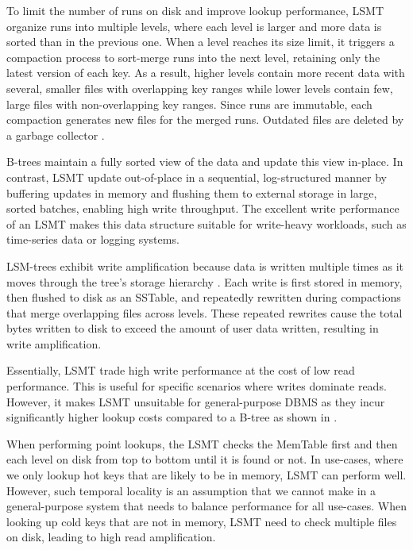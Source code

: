 To limit the number of runs on disk and improve lookup performance, \ac{LSMT} organize runs into multiple levels, where each level is larger and more data is sorted than in the previous one.
When a level reaches its size limit, it triggers a compaction process to sort-merge runs into the next level, retaining only the latest version of each key.
As a result, higher levels contain more recent data with several, smaller files with overlapping key ranges while lower levels contain few, large files with non-overlapping key ranges.
Since runs are immutable, each compaction generates new files for the merged runs.
Outdated files are deleted by a garbage collector \cite{sarkar2022lsmt}.


B-trees maintain a fully sorted view of the data and update this view in-place.
In contrast, \ac{LSMT} update out-of-place in a sequential, log-structured manner by buffering updates in memory and flushing them to external storage in large, sorted batches, enabling high write throughput.
The excellent write performance of an \ac{LSMT} makes this data structure suitable for write-heavy workloads, such as time-series data or logging systems.


LSM-trees exhibit write amplification because data is written multiple times as it moves through the tree's storage hierarchy \cite{kuszmaul2014fractal}.
Each write is first stored in memory, then flushed to disk as an SSTable, and repeatedly rewritten during compactions that merge overlapping files across levels. 
These repeated rewrites cause the total bytes written to disk to exceed the amount of user data written, resulting in write amplification.

Essentially, \ac{LSMT} trade high write performance at the cost of low read performance.
This is useful for specific scenarios where writes dominate reads.
However, it makes \ac{LSMT} unsuitable for general-purpose \ac{DBMS} as they incur significantly higher lookup costs compared to a B-tree as shown in \cite{gorrod2017wiredtiger}.

When performing point lookups, the \ac{LSMT} checks the MemTable first and then each level on disk from top to bottom until it is found or not.
In use-cases, where we only lookup hot keys that are likely to be in memory, \ac{LSMT} can perform well.
However, such temporal locality is an assumption that we cannot make in a general-purpose system that needs to balance performance for all use-cases.
When looking up cold keys that are not in memory, \ac{LSMT} need to check multiple files on disk, leading to high read amplification.

